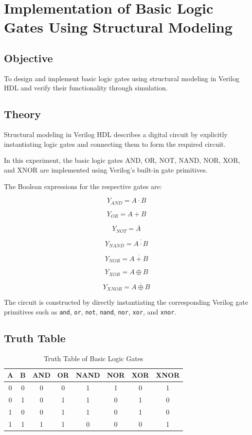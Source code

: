 \documentclass[12pt,a4paper]{report}
\begin{document}
\chapter{Implementation of Basic Logic Gates Using Structural Modeling}
\label{ch:pdf13}

\section{Objective}

To design and implement basic logic gates using structural modeling in Verilog HDL and verify their functionality through simulation.

\section{Theory}

Structural modeling in Verilog HDL describes a digital circuit by explicitly instantiating logic gates and connecting them to form the required circuit.

In this experiment, the basic logic gates AND, OR, NOT, NAND, NOR, XOR, and XNOR are implemented using Verilog's built-in gate primitives.

The Boolean expressions for the respective gates are:

\[
Y_{AND} = A \cdot B
\]

\[
Y_{OR} = A + B
\]

\[
Y_{NOT} = \overline{A}
\]

\[
Y_{NAND} = \overline{A \cdot B}
\]

\[
Y_{NOR} = \overline{A + B}
\]

\[
Y_{XOR} = A \oplus B
\]

\[
Y_{XNOR} = \overline{A \oplus B}
\]

The circuit is constructed by directly instantiating the corresponding Verilog gate primitives such as \texttt{and}, \texttt{or}, \texttt{not}, \texttt{nand}, \texttt{nor}, \texttt{xor}, and \texttt{xnor}.

\section{Truth Table}

\begin{table}[H]
    \centering
    \caption{Truth Table of Basic Logic Gates}
    \label{tab:basic_gates_structural}
    \begin{tabular}{|c|c|c|c|c|c|c|c|}
    \hline
    \textbf{A} & \textbf{B} & \textbf{AND} & \textbf{OR} &
    \textbf{NAND} & \textbf{NOR} & \textbf{XOR} & \textbf{XNOR} \\
    \hline
    0 & 0 & 0 & 0 & 1 & 1 & 0 & 1 \\
    \hline
    0 & 1 & 0 & 1 & 1 & 0 & 1 & 0 \\
    \hline
    1 & 0 & 0 & 1 & 1 & 0 & 1 & 0 \\
    \hline
    1 & 1 & 1 & 1 & 0 & 0 & 0 & 1 \\
    \hline
    \end{tabular}
\end{table}
\end{document}
